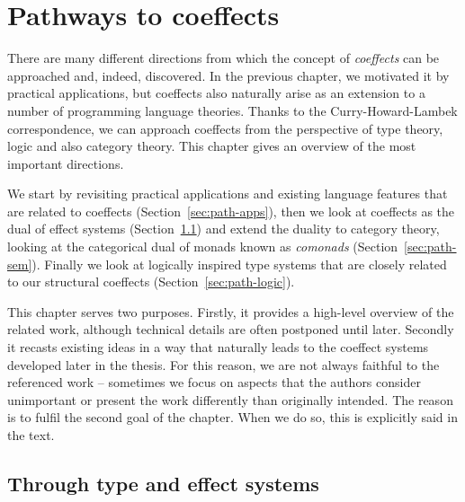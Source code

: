 

\chapter{Pathways to coeffects} 
\label{ch:pathways} 


There are many different directions from which the concept of \emph{coeffects} can be approached 
and, indeed, discovered. In the previous chapter, we motivated it by practical applications, but 
coeffects also naturally arise as an extension to a number of programming language theories.
Thanks to the Curry-Howard-Lambek correspondence, we can approach coeffects from the perspective of 
type theory, logic and also category theory. This chapter gives an overview of the most 
important directions.

We start by revisiting practical applications and existing language features that are related to 
coeffects (Section~\ref{sec:path-apps}), then we look at coeffects as the dual of effect systems
(Section~\ref{sec:path-eff}) and extend the duality to category theory, looking at the categorical 
dual of monads known as \emph{comonads} (Section~\ref{sec:path-sem}). Finally we look at logically 
inspired type systems that are closely related to our structural coeffects 
(Section~\ref{sec:path-logic}).

This chapter serves two purposes. Firstly, it provides a high-level overview of the  related work, 
although technical details are often postponed until later. Secondly it recasts existing ideas in 
a way that naturally leads to the coeffect systems developed later in the thesis. For this reason, 
we are not always faithful to the referenced work -- sometimes we focus on aspects that the 
authors consider unimportant or present the work differently than originally intended. The reason 
is to fulfil the second goal of the chapter. When we do so, this is explicitly said in the text.


\section{Through type and effect systems}
\label{sec:path-eff}

